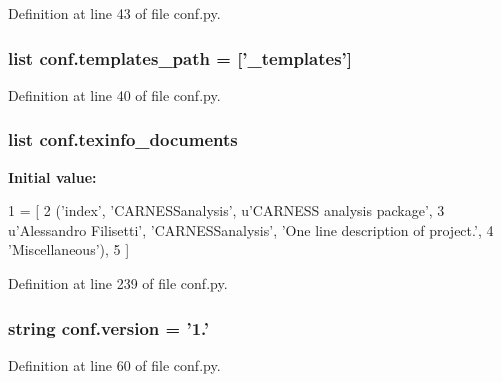 Definition at line 43 of file conf.\-py.

\hypertarget{a00101_ae850ae634911b713e036b43894fdd525}{
\subsubsection[{templates\-\_\-path}]{\setlength{\rightskip}{0pt plus 5cm}list conf.\-templates\-\_\-path = \mbox{[}'\-\_\-templates'\mbox{]}}}\label{a00101_ae850ae634911b713e036b43894fdd525}


Definition at line 40 of file conf.\-py.

\hypertarget{a00101_a54b0faed214ac92017d5689efbb10672}{
\subsubsection[{texinfo\-\_\-documents}]{\setlength{\rightskip}{0pt plus 5cm}list conf.\-texinfo\-\_\-documents}}\label{a00101_a54b0faed214ac92017d5689efbb10672}
{\bfseries Initial value\-:}
\begin{DoxyCode}
1 = [
2   (\textcolor{stringliteral}{'index'}, \textcolor{stringliteral}{'CARNESSanalysis'}, \textcolor{stringliteral}{u'CARNESS analysis package'},
3    \textcolor{stringliteral}{u'Alessandro Filisetti'}, \textcolor{stringliteral}{'CARNESSanalysis'}, \textcolor{stringliteral}{'One line description of project.'},
4    \textcolor{stringliteral}{'Miscellaneous'}),
5 ]
\end{DoxyCode}


Definition at line 239 of file conf.\-py.

\hypertarget{a00101_ade15c5b54093b64d7c428ec19ca5b1cb}{
\subsubsection[{version}]{\setlength{\rightskip}{0pt plus 5cm}string conf.\-version = '1.'}}\label{a00101_ade15c5b54093b64d7c428ec19ca5b1cb}


Definition at line 60 of file conf.\-py.

